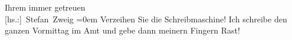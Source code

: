 \pstart
           Ihrem immer getreuen{\\[\baselineskip]}\spacefill\mbox{{[}hs.:{]} Stefan Zweig}\pend
           \leftskip=0em{}
\pstart
           \noindent{}Verzeihen Sie die Schreibmaschine! Ich schreibe den ganzen Vormittag im Amt und
                  gebe dann meinern Fingern Rast!\pend
           \endnumbering{}
\begin{anhang}
\end{anhang}
      